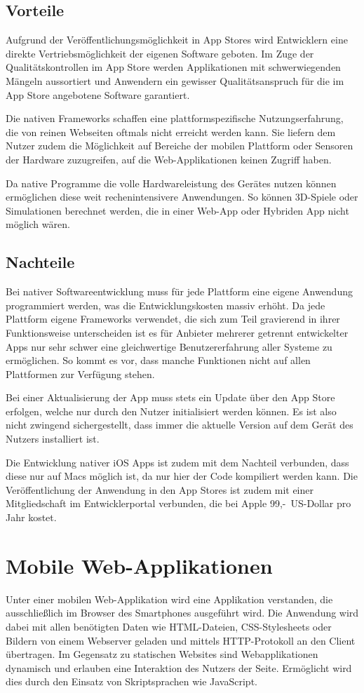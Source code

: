 \subsection{Vorteile}
%
Aufgrund der Veröffentlichungsmöglichkeit in App Stores wird Entwicklern eine direkte Vertriebsmöglichkeit der eigenen Software geboten. Im Zuge der Qualitätskontrollen im App Store werden Applikationen mit schwerwiegenden Mängeln aussortiert und Anwendern ein gewisser Qualitätsanspruch für die im App Store angebotene Software garantiert.

Die nativen Frameworks schaffen eine plattformspezifische Nutzungserfahrung, die von reinen Webseiten oftmals nicht erreicht werden kann. Sie liefern dem Nutzer zudem die Möglichkeit auf Bereiche der mobilen Plattform oder Sensoren der Hardware zuzugreifen, auf die Web-Applikationen keinen Zugriff haben.

Da native Programme die volle Hardwareleistung des Gerätes nutzen können ermöglichen diese weit rechenintensivere Anwendungen. So können 3D-Spiele oder Simulationen berechnet werden, die in einer Web-App oder Hybriden App nicht möglich wären.
%
\subsection{Nachteile}
%
Bei nativer Softwareentwicklung muss für jede Plattform eine eigene Anwendung programmiert werden, was die Entwicklungskosten massiv erhöht. Da jede Plattform eigene Frameworks verwendet, die sich zum Teil gravierend in ihrer Funktionsweise unterscheiden ist es für Anbieter mehrerer getrennt entwickelter Apps nur sehr schwer eine gleichwertige Benutzererfahrung aller Systeme zu ermöglichen. So kommt es vor, dass manche Funktionen nicht auf allen Plattformen zur Verfügung stehen.

Bei einer Aktualisierung der App muss stets ein Update über den App Store erfolgen, welche nur durch den Nutzer initialisiert werden können. Es ist also nicht zwingend sichergestellt, dass immer die aktuelle Version auf dem Gerät des Nutzers installiert ist.

Die Entwicklung nativer iOS Apps ist zudem mit dem Nachteil verbunden, dass diese nur auf Macs möglich ist, da nur hier der Code kompiliert werden kann. Die Veröffentlichung der Anwendung in den App Stores ist zudem mit einer Mitgliedschaft im Entwicklerportal verbunden, die bei Apple 99,-~US-Dollar pro Jahr kostet. 
%
%
\section{Mobile Web-Applikationen}
\label{mobileWebApplikationen}
%
Unter einer mobilen Web-Applikation wird eine Applikation verstanden, die ausschließlich im Browser des Smartphones ausgeführt wird. Die Anwendung wird dabei mit allen benötigten Daten wie HTML-Dateien, CSS-Stylesheets oder Bildern von einem Webserver geladen und mittels HTTP-Protokoll an den Client übertragen. Im Gegensatz zu statischen Websites sind Webapplikationen dynamisch und erlauben eine Interaktion des Nutzers der Seite. Ermöglicht wird dies durch den Einsatz von Skriptsprachen wie JavaScript. 

